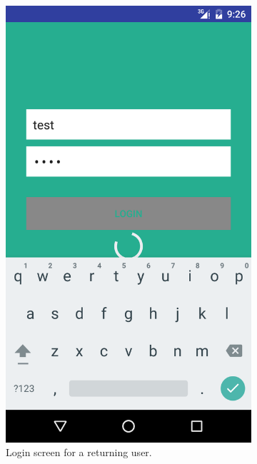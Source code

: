 \begin{figure}[ht!]
\begin{subfigure}[b]{0.24\textwidth}
        \includegraphics[width=\textwidth]{figures/s4test/logintest.png}
        \caption{Login screen for a returning user.}
        \label{s4tp:logintest}
\end{subfigure}
\begin{subfigure}[b]{0.24\textwidth}

\end{subfigure}
\end{figure}
